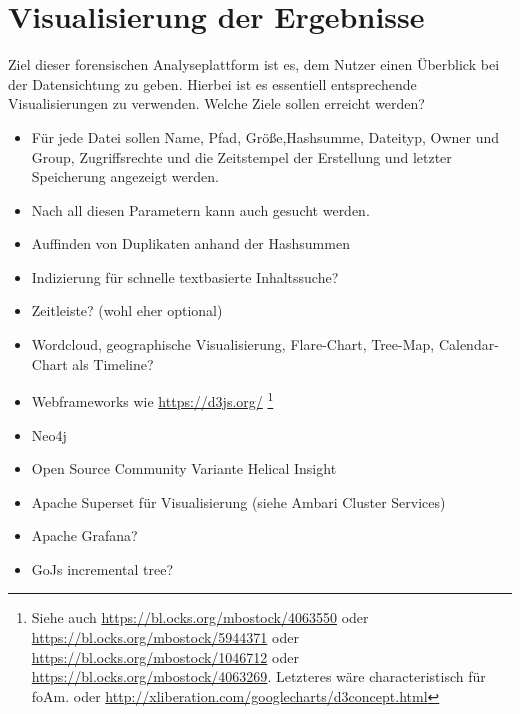 \chapter{Visualisierung der Ergebnisse}
Ziel dieser forensischen Analyseplattform ist es, dem Nutzer einen Überblick bei der Datensichtung zu geben. Hierbei ist es essentiell entsprechende Visualisierungen zu verwenden.
Welche Ziele sollen erreicht werden?
\begin{itemize}
\item Für jede Datei sollen Name, Pfad, Größe,Hashsumme, Dateityp, Owner und Group, Zugriffsrechte und die Zeitstempel der Erstellung und letzter Speicherung angezeigt werden. 
\item Nach all diesen Parametern kann auch gesucht werden.
\item Auffinden von Duplikaten anhand der Hashsummen
\item Indizierung für schnelle textbasierte Inhaltssuche?
\item Zeitleiste? (wohl eher optional)
\item Wordcloud, geographische Visualisierung, Flare-Chart, Tree-Map, Calendar-Chart als Timeline?
\item Webframeworks wie \url{https://d3js.org/} \footnote{Siehe auch \url{https://bl.ocks.org/mbostock/4063550} oder \url{https://bl.ocks.org/mbostock/5944371} oder \url{https://bl.ocks.org/mbostock/1046712} oder \url{https://bl.ocks.org/mbostock/4063269}. Letzteres wäre characteristisch für foAm. oder \url{http://xliberation.com/googlecharts/d3concept.html}}
\item Neo4j
\item Open Source Community Variante Helical Insight
\item Apache Superset für Visualisierung (siehe Ambari Cluster Services)
\item Apache Grafana?
\item GoJs incremental tree?
\end{itemize}
